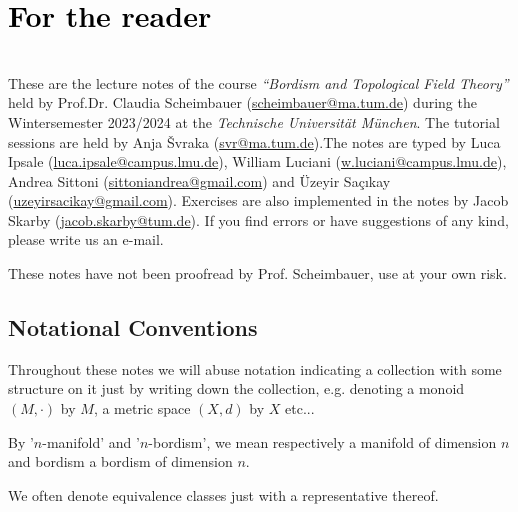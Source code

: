 \chapter*{\huge{\textcolor{black}{For the reader}}}
\hfill
\vspace{0.50cm}\\
These are the lecture notes of the course \textit{``Bordism and Topological Field Theory''} held by Prof.\hspace{1mm}Dr. Claudia Scheimbauer (\href{mailto:scheimbauer@ma.tum.de}{scheimbauer@ma.tum.de}) during the Wintersemester 2023/2024 at the \textit{Technische Universität München}. The tutorial sessions are held by Anja \v{S}vraka (\href{mailto:svr@ma.tum.de}{svr@ma.tum.de}).\hspace{1.5mm}The notes are typed by Luca Ipsale (\href{mailto:luca.ipsale@campus.lmu.de}{luca.ipsale@campus.lmu.de}), William Luciani (\href{mailto:w.luciani@campus.lmu.de}{w.luciani@campus.lmu.de}), Andrea Sittoni (\href{mailto:sittoniandrea@gmail.com}{sittoniandrea@gmail.com}) and Üzeyir Sa\c{c}{\i}kay (\href{mailto:uzeyirsacikay@gmail.com}{uzeyirsacikay@gmail.com}). Exercises are also implemented in the notes by Jacob Skarby (\href{mailto:jacob.skarby@tum.de}{jacob.skarby@tum.de}). If you find
 errors or have suggestions of any kind, please write us an e-mail.

\vspace{1cm}

{\LARGE \warning These notes have not been proofread by Prof. Scheimbauer, use at your own risk}.

\updateinfo
\thispagestyle{empty}



\clearpage
\thispagestyle{empty}
\cleardoublepage
\section*{Notational Conventions}
\begin{notat}
    Throughout these notes we will abuse notation indicating a collection with some structure on it just by
     writing down the collection, e.g. denoting a monoid $(M,\cdot)$ by $M$, a metric space $(X,d)$ by
      $X$ etc...
\end{notat}
\begin{notat}
    By '$n$-manifold' and '$n$-bordism', we mean respectively a manifold of dimension $n$
     and bordism a bordism of dimension $n$.
\end{notat}
\begin{notat}
    We often denote equivalence classes just with a representative thereof. 
\end{notat}

